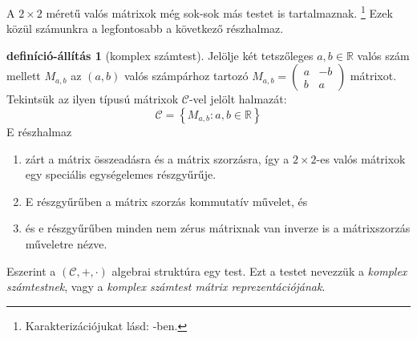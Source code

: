 \documentclass[9pt, a4paper, showtrims]{memoir}
\theoremstyle{plain}
\theoremstyle{remark}
\theoremstyle{definition}
\newtheorem{defprop}[proposition]{definíció-állítás}
\begin{document}
A $2\times 2$ méretű valós mátrixok még sok-sok más testet is tartalmaznak.%
\footnote{Karakterizációjukat lásd: \parencite{MR1415833}-ben.}
Ezek közül számunkra a legfontosabb a következő részhalmaz.
\begin{defprop}[komplex számtest]
	Jelölje két tetszőleges $a,b\in\mathbb{R}$ valós szám mellett $M_{a,b}$ az
	$\left( a,b \right)$ valós számpárhoz tartozó
	\(
	M_{a,b}
	=
	\begin{pmatrix}
		a & -b \\
		b & a
	\end{pmatrix}
	\)
	mátrixot.
	Tekintsük az ilyen típusú mátrixok $\mathcal{C}$-vel jelölt halmazát:
	\[
		\mathcal{C}
		=
		\left\{
		M_{a,b}
		:a,b\in\mathbb{R}
		\right\}
	\]
	E részhalmaz
	\begin{enumerate}
		\item
		      zárt a mátrix összeadásra és a mátrix szorzásra,
		      így a $2\times 2$-es valós mátrixok egy speciális egységelemes részgyűrűje.
		\item
		      E részgyűrűben a mátrix szorzás kommutatív művelet,
		      és
		\item
		      és e részgyűrűben minden nem zérus mátrixnak van inverze is a mátrixszorzás műveletre nézve.
	\end{enumerate}
	Eszerint a $\left( \mathcal{C},+,\cdot \right)$ algebrai struktúra egy test.
	Ezt a testet nevezzük a \emph{komplex számtestnek},
	vagy a \emph{komplex számtest mátrix reprezentációjának}.
\end{defprop}
\end{document}
